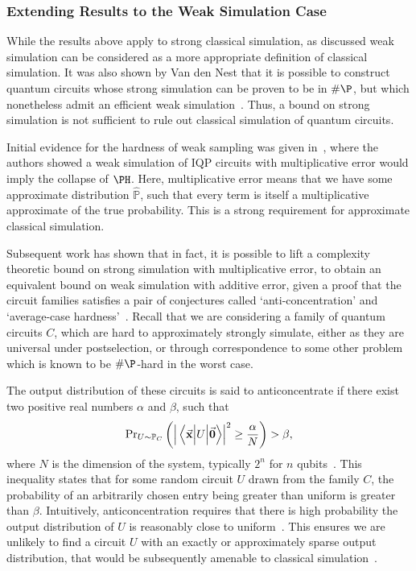 \subsubsection{Extending Results to the Weak Simulation Case}
While the results above apply to strong classical simulation, as discussed weak simulation can be considered as a more appropriate definition of classical simulation. It was also shown by Van den Nest that it is possible to construct quantum circuits whose strong simulation can be proven to be in $\#\P$, but which nonetheless admit an efficient weak simulation~\cite{VandenNest2008}. Thus, a bound on strong simulation is not sufficient to rule out classical simulation of quantum circuits.\par
Initial evidence for the hardness of weak sampling was given in~\cite{Bremner2011}, where the authors showed a weak simulation of IQP circuits with multiplicative error would imply the collapse of $\PH$. Here, multiplicative error means that we have some approximate distribution $\hat{\mathbb{P}}$, such that every term is itself a multiplicative approximate of the true probability. This is a strong requirement for approximate classical simulation.\par
Subsequent work has shown that in fact, it is possible to lift a complexity theoretic bound on strong simulation with multiplicative error, to obtain an equivalent bound on weak simulation with additive error, given a proof that the circuit families satisfies a pair of conjectures called `anti-concentration' and `average-case hardness'~\cite{Hangleiter2017}. Recall that we are considering a family of quantum circuits $C$, which are hard to approximately strongly simulate, either as they are universal under postselection, or through correspondence to some other problem which is known to be $\#\P$-hard in the worst case.\par
The output distribution of these circuits is said to anticoncentrate if there exist two positive real numbers $\alpha$ and $\beta$, such that
\begin{equation}
\text{Pr}_{U\sim \mathbb{P}_{C}}\left(\left|\matrixel{\va{x}}{U}{\va{0}}\right|^{2}\geq \frac{\alpha}{N}\right) > \beta,
\label{eq:anticoncentration}
\end{equation}
where $N$ is the dimension of the system, typically $2^{n}$ for $n$ qubits~\cite{Hangleiter2017}. This inequality states that for some random circuit $U$ drawn from the family $C$, the probability of an arbitrarily chosen entry being greater than uniform is greater than $\beta$. Intuitively, anticoncentration requires that there is high probability the output distribution of $U$ is reasonably close to uniform~\cite{Harrow2017}. This ensures we are unlikely to find a circuit $U$ with an exactly or approximately sparse output distribution, that would be subsequently amenable to classical simulation~\cite{VandenNest2008,Schwarz2013}.\par
